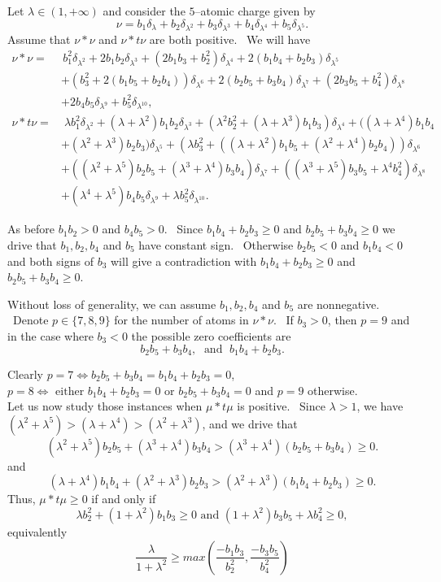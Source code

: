 \documentclass[12pt]{amsart}
\begin{document}
Let $  \lambda \in (1, +\infty)$  and  consider the $5$--atomic charge given by 
$$
\nu = b_1\delta_{\lambda}+b_2\delta_{\lambda^2}+b_3\delta_{\lambda^3}+b_4\delta_{\lambda^4}+b_5\delta_{\lambda^5}.
$$
Assume  that $ \nu*\nu$ and $\nu*t\nu $ are both positive. \ We will have
\begin{align*} \nu*\nu = & \, b_1^2\delta_{\lambda^2}+ 2b_1b_2\delta_{\lambda^3} +(2b_1b_3+b_2^2)\delta_{\lambda^4} +2(b_1b_4+b_2b_3)\delta_{\lambda^5}\\ & +(b_3^2+2(b_1b_5+b_2b_4))\delta_{\lambda^6}    
 +2(b_2b_5+b_3b_4)\delta_{\lambda^7}+ (2b_3b_5+b_4^2)\delta_{\lambda^8}\\ & + 2b_4b_5\delta_{\lambda^9} +b_{5}^2\delta_{\lambda^{10}}, \\
    \nu*t\nu = & \; \lambda b_1^2\delta_{\lambda^2}+ (\lambda+\lambda^2)b_1b_2\delta_{\lambda^3} +(\lambda^2 b_2^2+(\lambda+\lambda^3)b_1b_3)\delta_{\lambda^4}+((\lambda+\lambda^4)b_1b_4\\
    & + (\lambda^2+\lambda^3)b_2b_3)\delta_{\lambda^5} +(\lambda b_3^2+((\lambda+\lambda^2)b_1b_5+(\lambda^2+\lambda^4)b_2b_4))\delta_{\lambda^6}\\ & +((\lambda^2+\lambda^5)b_2b_5 
    +(\lambda^3+\lambda^4)b_3b_4)\delta_{\lambda^7} +((\lambda^3+\lambda^5)b_3b_5+\lambda^4 b_4^2)\delta_{\lambda^8} \\ & + (\lambda^4+\lambda^5)b_4b_5\delta_{\lambda^9} +\lambda b_{5}^2\delta_{\lambda^{10}}.
\end{align*} 

As before $b_1b_2>0$ and $b_4b_5>0$. \ Since $b_1b_4+b_2b_3\ge0 $ and $b_2b_5+b_3b_4\ge 0$ we drive that $b_1,b_2,b_4$ and $b_5$ have constant sign. \ Otherwise $b_2b_5<0$ and $b_1b_4<0$ and both signs of $b_3$ will give a contradiction with $b_1b_4+b_2b_3\ge0 $ and $b_2b_5+b_3b_4\ge 0$.

Without loss of generality, we can assume $b_1,b_2,b_4$ and $b_5$ are nonnegative. \ Denote $p\in\{7,8,9\}$  for the number of atoms in $\nu*\nu$. \ If $b_3>0$, then  $p=9$ and in the case where $b_3<0$    the possible zero coefficients are $$   b_2b_5+b_3b_4,\; \mbox{ and } \;  b_1b_4+b_2b_3.$$ 
 
Clearly  $p=7 \iff b_2b_5+b_3b_4=b_1b_4+b_2b_3=0$,  $p=8 \iff \mbox{ either } b_1b_4+b_2b_3=0 \mbox{ or } b_2b_5+b_3b_4=0 $ and $p=9 $ otherwise. \\
Let us now study those instances when $\mu*t\mu$ is positive. \ Since $ \lambda > 1$, we have  $(\lambda^2+\lambda^5)>(\lambda+\lambda^4) > (\lambda^2+\lambda^3)$, and we drive   that   $$(\lambda^2+\lambda^5)b_2b_5+(\lambda^3+\lambda^4)b_3b_4> (\lambda^3+\lambda^4)(b_2b_5+b_3b_4)\ge 0.$$ and  $$(\lambda+\lambda^4)b_1b_4+(\lambda^2+\lambda^3)b_2b_3>(\lambda^2+\lambda^3)(b_1b_4+b_2b_3)\ge 0.$$ 
 Thus, $\mu*t\mu\ge 0$ if and only if 
$$\lambda b_2^2+(1+\lambda^2)b_1b_3 \ge 0 \mbox{ and }  (1+\lambda^2)b_3b_5+\lambda b_4^2\ge 0, $$
equivalently 
\begin{equation}\label{xx}
    \frac{\lambda}{1+\lambda^2}\ge max(\frac{-b_1b_3}{b_2^2},\frac{-b_3b_5}{b_4^2})
\end{equation} 
\end{document}
